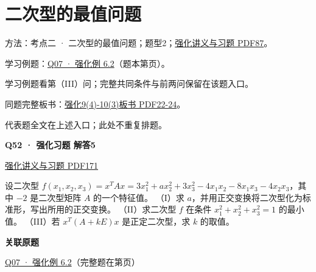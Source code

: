 \documentclass[UTF8,fontset=fandol,11pt,a4paper]{ctexart}
\newcommand{\source}[1]{{\footnotesize\color{Muted}#1\par}}
\newcommand{\qtitle}[2]{\par\needspace{5\baselineskip}\hypertarget{#1}{}\label{#1}\textbf{#2}\par}
\begin{document}
\section*{二次型的最值问题}
\hypertarget{node-D}{}
方法：考点二 · 二次型的最值问题；题型2；\href{file:///Users/skyintelligence/Desktop/\%E5\%BE\%97\%E8\%AF\%BB\%E4\%B8\%AA\%E7\%A0\%94-\%E5\%8C\%97\%E5\%A4\%A7\%E8\%BD\%AF\%E5\%BE\%AE/\%E6\%95\%B0\%E5\%AD\%A6\%20150/Kira\%C2\%B727\%E7\%BA\%BF\%E6\%80\%A7\%E4\%BB\%A3\%E6\%95\%B0\%E5\%BC\%BA\%E5\%8C\%96\%E8\%AE\%B2\%E4\%B9\%89\%2B\%E4\%B9\%A0\%E9\%A2\%98.pdf\#page=87}{强化讲义与习题 PDF87}。\par
学习例题：\hyperlink{R-EX-02}{Q07 · 强化例 6.2}（题本第\pageref*{R-EX-02}页）。\par
\source{学习例题看第（III）问；完整共同条件与前两问保留在该题入口。}
同题完整板书：\href{file:///Users/skyintelligence/Desktop/\%E5\%BE\%97\%E8\%AF\%BB\%E4\%B8\%AA\%E7\%A0\%94-\%E5\%8C\%97\%E5\%A4\%A7\%E8\%BD\%AF\%E5\%BE\%AE/\%E6\%95\%B0\%E5\%AD\%A6\%20150/\%E7\%BA\%BF\%E6\%80\%A7\%E4\%BB\%A3\%E6\%95\%B0/\%E7\%BA\%BF\%E4\%BB\%A3\%E5\%BC\%BA\%E5\%8C\%969\%284\%29-10\%283\%29\%20\%20\%E7\%AC\%AC\%E4\%BA\%94\%E5\%85\%AD\%E7\%AB\%A0\%20\%E5\%AE\%9E\%E5\%AF\%B9\%E7\%A7\%B0\%E7\%9F\%A9\%E9\%98\%B5\%26\%E4\%BA\%8C\%E6\%AC\%A1\%E5\%9E\%8B1\%E3\%80\%90\%E4\%BE\%8B5.6\%E3\%80\%91-\%E3\%80\%90\%E4\%BE\%8B6.4\%E3\%80\%91.pdf\#page=22}{强化9(4)-10(3)板书 PDF22-24}。\par
\vspace{3mm}
\source{代表题全文在上述入口；此处不重复排题。}
\begin{minipage}{\linewidth}
\qtitle{R-LONG-05}{Q52 · 强化习题 解答5}
\source{\href{file:///Users/skyintelligence/Desktop/\%E5\%BE\%97\%E8\%AF\%BB\%E4\%B8\%AA\%E7\%A0\%94-\%E5\%8C\%97\%E5\%A4\%A7\%E8\%BD\%AF\%E5\%BE\%AE/\%E6\%95\%B0\%E5\%AD\%A6\%20150/Kira\%C2\%B727\%E7\%BA\%BF\%E6\%80\%A7\%E4\%BB\%A3\%E6\%95\%B0\%E5\%BC\%BA\%E5\%8C\%96\%E8\%AE\%B2\%E4\%B9\%89\%2B\%E4\%B9\%A0\%E9\%A2\%98.pdf\#page=171}{强化讲义与习题 PDF171}}
设二次型 $f(x_1,x_2,x_3)=x^TAx=3x_1^2+ax_2^2+3x_3^2-4x_1x_2-8x_1x_3-4x_2x_3$，其中 $-2$ 是二次型矩阵 $A$ 的一个特征值。
（I）求 $a$，并用正交变换将二次型化为标准形，写出所用的正交变换。
（II）求二次型 $f$ 在条件 $x_1^2+x_2^2+x_3^2=1$ 的最小值。
（III）若 $x^T(A+kE)x$ 是正定二次型，求 $k$ 的取值。
\end{minipage}\par\vspace{7mm}
\textbf{关联原题}\par
\hyperlink{R-EX-02}{Q07 · 强化例 6.2}（完整题在第\pageref*{R-EX-02}页）\par
\clearpage
\end{document}
